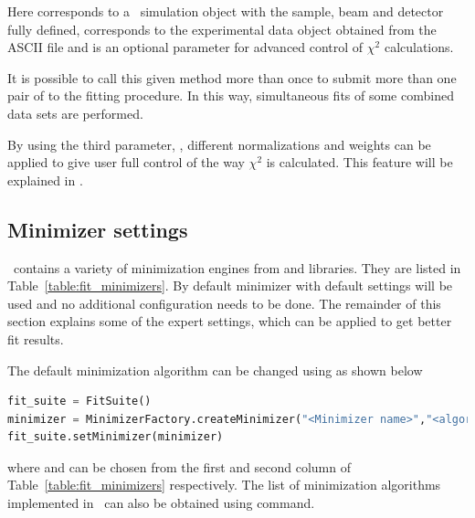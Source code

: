 Here  corresponds to a \BornAgain\ simulation object
with the  sample, beam and detector fully defined, 
corresponds to the experimental data object obtained from the ASCII file and  is an optional parameter for advanced 
control of $\chi^2$ calculations.

It is possible to call this given method more than once to submit more than one pair of
 to the fitting procedure.
In this way, simultaneous fits of
some combined data sets are performed.

By using the third parameter, , different normalizations and weights
can be applied to give user full control of the way $\chi^2$ is calculated.
This feature will be explained in .


%
\subsection{Minimizer settings}

\BornAgain\ contains a variety of minimization engines from  and 
libraries. They are listed in Table~\ref{table:fit_minimizers}.
By default  minimizer with default settings will be used and no additional
configuration needs to be done.
The remainder of this section explains some of the expert settings, which can be applied to get better 
fit results.

The default minimization algorithm can be changed using 
 as shown below
\begin{lstlisting}[language=python, style=eclipseboxed,numbers=none]
fit_suite = FitSuite()
minimizer = MinimizerFactory.createMinimizer("<Minimizer name>","<algorithm>")
fit_suite.setMinimizer(minimizer)
\end{lstlisting}

where  and  can be chosen from the first and
second column of Table~\ref{table:fit_minimizers} respectively. 
The list of minimization algorithms implemented in \BornAgain\
can also be obtained using  command.


